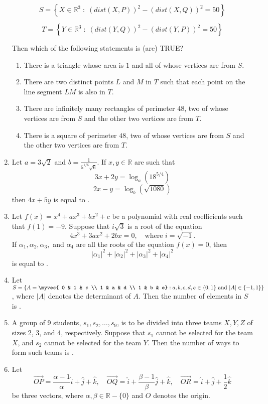 \documentclass[12pt,a4paper]{article}
\begin{document}
\begin{enumerate}
\[
S = \left\{ X \in \mathbb{R}^3 \; : \; (dist(X,P))^2 - (dist(X,Q))^2 = 50 \right\}
\]

\[
T = \left\{ Y \in \mathbb{R}^3 \; : \; (dist(Y,Q))^2 - (dist(Y,P))^2 = 50 \right\}
\]

Then which of the following statements is (are) TRUE?

\begin{enumerate}
    \item There is a triangle whose area is $1$ and all of whose vertices are from $S$.
    \item There are two distinct points $L$ and $M$ in $T$ such that each point on the line segment $LM$ is also in $T$.
    \item There are infinitely many rectangles of perimeter $48$, two of whose vertices are from $S$ and the other two vertices are from $T$.
    \item There is a square of perimeter $48$, two of whose vertices are from $S$ and the other two vertices are from $T$.
\end{enumerate}
\item Let $a = 3\sqrt{2}$ and $b = \frac{1}{5^{1/6} \sqrt{6}}$. If $x, y \in \mathbb{R}$ are such that  
\[
    3x + 2y = \log_a \left( 18^{5/4} \right)
\]
\[
    2x - y = \log_b \left( \sqrt{1080} \right)
\]
    then $4x + 5y$ is equal to \underline{\quad \quad}.
\item Let $f(x) = x^4 + ax^3 + bx^2 + c$ be a polynomial with real coefficients such that $f(1) = -9$. Suppose that $i\sqrt{3}$ is a root of the equation  
\[
    4x^3 + 3ax^2 + 2bx = 0, \quad \text{where } i = \sqrt{-1}.
\]
    If $\alpha_1, \alpha_2, \alpha_3,$ and $\alpha_4$ are all the roots of the equation $f(x) = 0$, then  
\[
    |\alpha_1|^2 + |\alpha_2|^2 + |\alpha_3|^2 + |\alpha_4|^2
\]
    is equal to \underline{\quad \quad}.
\item Let $S = \left\{ A =  
	\myvec{  
    0 & 1 & c \\  
    1 & a & d \\  
    1 & b & e}
    : a, b, c, d, e \in \{0,1\} \text{ and } |A| \in \{-1,1\}  
    \right\}$,  
    where $|A|$ denotes the determinant of $A$.  
    Then the number of elements in $S$ is \underline{\quad \quad}.
\item A group of 9 students, $s_1, s_2, \dots, s_9$, is to be divided into three teams $X, Y, Z$ of sizes 2, 3, and 4, respectively. Suppose that $s_1$ cannot be selected for the team $X$, and $s_2$ cannot be selected for the team $Y$.  
    Then the number of ways to form such teams is \underline{\quad \quad}.
\item Let  
\[\overrightarrow{OP} = \frac{\alpha -1}{\alpha} \hat{i} + \hat{j} + \hat{k}, \quad
    \overrightarrow{OQ} = \hat{i} + \frac{\beta -1}{\beta} \hat{j} + \hat{k}, \quad
    \overrightarrow{OR} = \hat{i} + \hat{j} + \frac{1}{2} \hat{k}
\]
    be three vectors, where $\alpha, \beta \in \mathbb{R} - \{0\}$ and $O$ denotes the origin.  


\end{enumerate}
\end{document}
